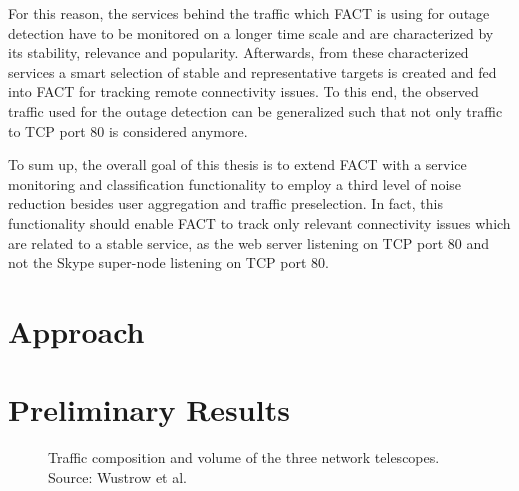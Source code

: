 \documentclass{sigcomm-alternate}
\begin{document}
For this reason, the services behind the traffic which FACT is using for outage detection have to be monitored on a longer time scale and are characterized by its stability, relevance and popularity. Afterwards, from these characterized services a smart selection of stable and representative targets is created and fed into FACT for tracking remote connectivity issues. To this end, the observed traffic used for the outage detection can be generalized such that not only traffic to TCP port 80 is considered anymore. 

To sum up, the overall goal of this thesis is to extend FACT with a service monitoring and classification functionality to employ a third level of noise reduction besides user aggregation and traffic preselection. In fact, this functionality should enable FACT to track only relevant connectivity issues which are related to a stable service, as the web server listening on TCP port 80 and not the Skype super-node listening on TCP port 80.

\section{Approach}



\section{Preliminary Results}

\begin{figure*}[h!]
\centering
\caption{Traffic composition and volume of the three network telescopes. Source: Wustrow et al.}
\label{fig:Wustrow_spatial}
\end{figure*}


 
% 

\end{document}
